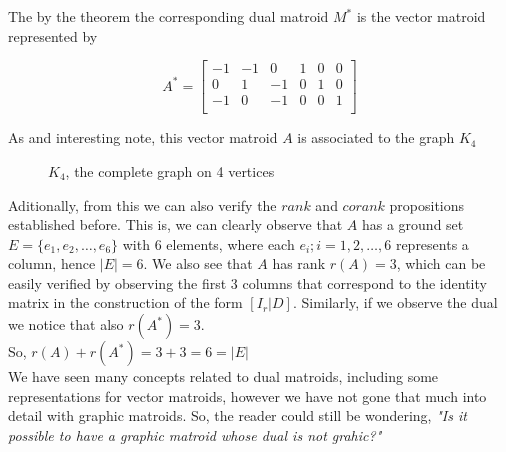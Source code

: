 The by the theorem the corresponding dual matroid $M^*$ is the vector matroid represented by 
        \begin{figure}[H]
            $$A^* = \begin{bmatrix}
                -1 & -1 & 0 & 1 & 0 & 0 \\
                0 & 1 & -1 & 0 & 1 & 0 \\
                -1 & 0 & -1 & 0 & 0 & 1 \\
            \end{bmatrix}$$
        \end{figure}
As and interesting note, this vector matroid $A$ is associated to the graph $K_4$ 
       \begin{figure}[H]
        \centering
            \caption{$K_4$, the complete graph on 4 vertices}
            \label{fig:enter-label}
        \end{figure}

Aditionally, from this we can also verify the $rank$ and $corank$ propositions established before. This is, we can clearly observe that $A$ has a ground set $E=\{e_1, e_2, \dots , e_6\}$ with 6 elements, where each $e_i; i =1,2, \dots,6$ represents a column, hence $|E|=6$. We also see that $A$ has rank $r(A)=3$, which can be easily verified by observing the first 3 columns that correspond to the identity matrix in the construction of the form $[I_r|D]$. Similarly, if we observe the dual we notice that also $r(A^*)=3$. \\So, $r(A)+r(A^*)= 3 + 3 = 6 = |E|$\\


%

We have seen many concepts related to dual matroids, including some representations for vector matroids, however we have not gone that much into detail with graphic matroids. So, the reader could still be wondering, \textit{"Is it possible to have a graphic matroid whose dual is not grahic?"}

